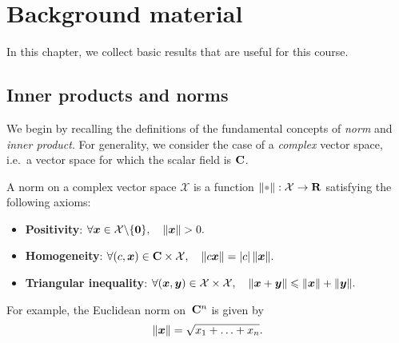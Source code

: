\setlength{\OuterFrameSep}{0pt}

\chapter{Background material}%
\label{cha:vectors_and_matrices}
\minitoc

In this chapter,
we collect basic results that are useful for this course.

\section{Inner products and norms}%
\label{sec:inner_product_and_norm}

We begin by recalling the definitions of the fundamental concepts of \emph{norm} and \emph{inner product}.
For generality,
we consider the case of a \emph{complex} vector space,
i.e.\ a vector space for which the scalar field is $\mathbf C$.
\begin{definition}
A norm on a complex vector space $\mathcal X$ is a function $\norm{\placeholder}: \mathcal X \to \real$ satisfying the following axioms:
\begin{itemize}
    \item
        \textbf{Positivity}:
        \(
            \forall \mathbf{\boldsymbol{x}} \in \mathcal X \backslash \{\mathbf{\boldsymbol{0}}\}, \quad
            \lVert\mathbf{\boldsymbol{x}}\rVert > 0.
        \)

    \item
        \textbf{Homogeneity}:
        \(
            \forall (c, \mathbf{\boldsymbol{x}}) \in \mathbf C \times \mathcal X, \quad
            \lVert c \mathbf{\boldsymbol{x}}\rVert = \lvert c\rvert \, \lVert\mathbf{\boldsymbol{x}}\rVert .
        \)

    \item
        \textbf{Triangular inequality}:
        \(
            \forall (\mathbf{\boldsymbol{x}}, \mathbf{\boldsymbol{y}}) \in \mathcal X \times \mathcal X, \quad
            \lVert\mathbf{\boldsymbol{x}} + \mathbf{\boldsymbol{y}}\rVert \leqslant \lVert\mathbf{\boldsymbol{x}}\rVert + \lVert\mathbf{\boldsymbol{y}}\rVert.
        \)
\end{itemize}
\end{definition}
For example,
the Euclidean norm on~$\mathbf C^n$ is given by
\[
    \lVert\mathbf{\boldsymbol{x}}\rVert = \sqrt{x_1 + \dotsc + x_n}.
\]

